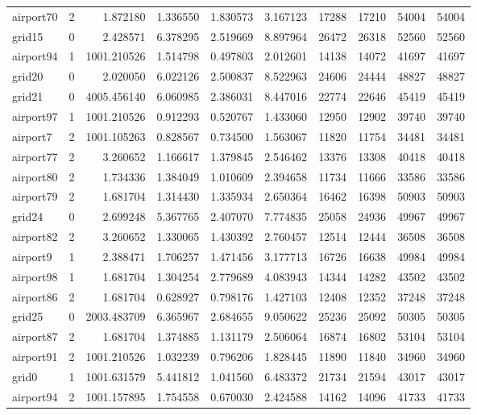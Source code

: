 \begin{longtable}{|l|r|r|r|r|r|r|r|r|r|}
airport70 & 2 & 1.872180 & 1.336550 & 1.830573 & 3.167123 & 17288 & 17210 & 54004 & 54004 \\
grid15 & 0 & 2.428571 & 6.378295 & 2.519669 & 8.897964 & 26472 & 26318 & 52560 & 52560 \\
airport94 & 1 & 1001.210526 & 1.514798 & 0.497803 & 2.012601 & 14138 & 14072 & 41697 & 41697 \\
grid20 & 0 & 2.020050 & 6.022126 & 2.500837 & 8.522963 & 24606 & 24444 & 48827 & 48827 \\
grid21 & 0 & 4005.456140 & 6.060985 & 2.386031 & 8.447016 & 22774 & 22646 & 45419 & 45419 \\
airport97 & 1 & 1001.210526 & 0.912293 & 0.520767 & 1.433060 & 12950 & 12902 & 39740 & 39740 \\
airport7 & 2 & 1001.105263 & 0.828567 & 0.734500 & 1.563067 & 11820 & 11754 & 34481 & 34481 \\
airport77 & 2 & 3.260652 & 1.166617 & 1.379845 & 2.546462 & 13376 & 13308 & 40418 & 40418 \\
airport80 & 2 & 1.734336 & 1.384049 & 1.010609 & 2.394658 & 11734 & 11666 & 33586 & 33586 \\
airport79 & 2 & 1.681704 & 1.314430 & 1.335934 & 2.650364 & 16462 & 16398 & 50903 & 50903 \\
grid24 & 0 & 2.699248 & 5.367765 & 2.407070 & 7.774835 & 25058 & 24936 & 49967 & 49967 \\
airport82 & 2 & 3.260652 & 1.330065 & 1.430392 & 2.760457 & 12514 & 12444 & 36508 & 36508 \\
airport9 & 1 & 2.388471 & 1.706257 & 1.471456 & 3.177713 & 16726 & 16638 & 49984 & 49984 \\
airport98 & 1 & 1.681704 & 1.304254 & 2.779689 & 4.083943 & 14344 & 14282 & 43502 & 43502 \\
airport86 & 2 & 1.681704 & 0.628927 & 0.798176 & 1.427103 & 12408 & 12352 & 37248 & 37248 \\
grid25 & 0 & 2003.483709 & 6.365967 & 2.684655 & 9.050622 & 25236 & 25092 & 50305 & 50305 \\
airport87 & 2 & 1.681704 & 1.374885 & 1.131179 & 2.506064 & 16874 & 16802 & 53104 & 53104 \\
airport91 & 2 & 1001.210526 & 1.032239 & 0.796206 & 1.828445 & 11890 & 11840 & 34960 & 34960 \\
grid0 & 1 & 1001.631579 & 5.441812 & 1.041560 & 6.483372 & 21734 & 21594 & 43017 & 43017 \\
airport94 & 2 & 1001.157895 & 1.754558 & 0.670030 & 2.424588 & 14162 & 14096 & 41733 & 41733 \\

\end{longtable}
